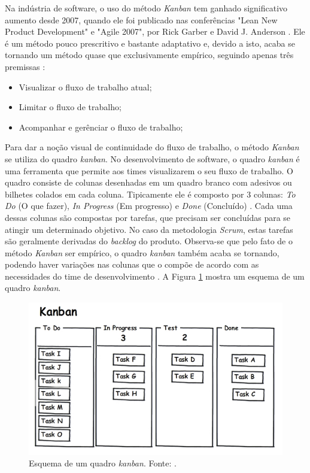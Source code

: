 Na indústria de software, o uso do método \textit{Kanban} tem ganhado significativo aumento desde 2007, quando ele foi publicado nas conferências "Lean New Product Development" e "Agile 2007", por Rick Garber e David J. Anderson \cite{silva2010kanban}. Ele é um método pouco prescritivo e bastante adaptativo e, devido a isto, acaba se tornando um método quase que exclusivamente empírico, seguindo apenas três premissas \cite{silva2010kanban}:

\begin{itemize}
\item Visualizar o fluxo de trabalho atual;
\item Limitar o fluxo de trabalho;
\item Acompanhar e gerênciar o fluxo de trabalho;
\end{itemize}

Para dar a noção visual de continuidade do fluxo de trabalho, o método \textit{Kanban} se utiliza do quadro \textit{kanban}. No desenvolvimento de software, o quadro \textit{kanban} é uma ferramenta que permite aos times visualizarem o seu fluxo de trabalho. O quadro consiste de colunas desenhadas em um quadro branco com adesivos ou bilhetes colados em cada coluna. Tipicamente ele é composto por 3 colunas: \textit{To Do} (O que fazer), \textit{In Progress} (Em progresso) e \textit{Done} (Concluído) \cite{agile2014}. Cada uma dessas colunas são compostas por tarefas, que precisam ser concluídas para se atingir um determinado objetivo. No caso da metodologia \textit{Scrum}, estas tarefas são geralmente derivadas do \textit{backlog} do produto. Observa-se que pelo fato de o método \textit{Kanban} ser empírico, o quadro \textit{kanban} também acaba se tornando, podendo haver variações nas colunas que o compõe de acordo com as necessidades do time de desenvolvimento \cite{agile2014}. A Figura \ref{quadro_kanban} mostra um esquema de um quadro \textit{kanban}.

\begin{figure}[!htb]
	\centering
		\includegraphics{figuras/Kanban}
	\caption{Esquema de um quadro \textit{kanban}. Fonte: \cite{kanbanImage}.}
	\label{quadro_kanban}
\end{figure}

